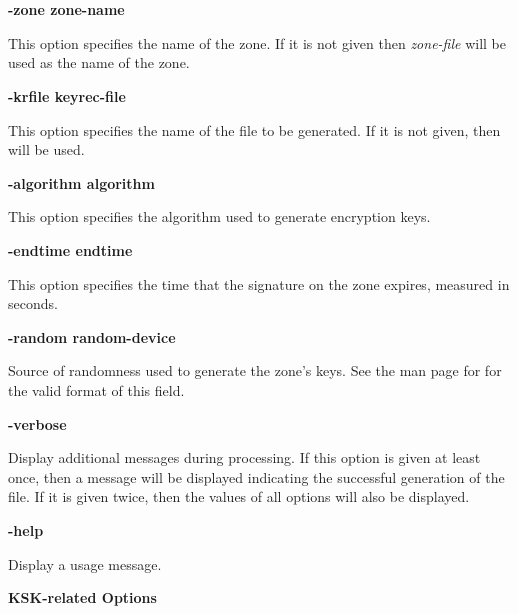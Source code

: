 \begin{description}

\item {\bf -zone zone-name}\verb" "

This option specifies the name of the zone.  If it is not given then
{\it zone-file} will be used as the name of the zone.

\item {\bf -krfile keyrec-file}\verb" "

This option specifies the name of the  file to be generated.
If it is not given, then  will be used.

\item {\bf -algorithm algorithm}\verb" "

This option specifies the algorithm used to generate encryption keys.

\item {\bf -endtime endtime}\verb" "

This option specifies the time that the signature on the zone expires,
measured in seconds.

\item {\bf -random random-device}\verb" "

Source of randomness used to generate the zone's keys. See the man
page for  for the valid format of this field.

\item {\bf -verbose}\verb" "

Display additional messages during processing.  If this option is given
at least once, then a message will be displayed indicating the successful
generation of the  file.  If it is given twice, then the
values of all options will also be displayed.

\item {\bf -help}\verb" "

Display a usage message.

\end{description}

{\bf KSK-related Options}

